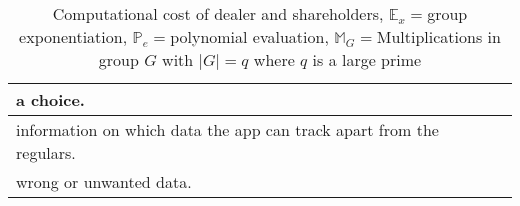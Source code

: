 \begin{table}[H]
\begin{tabular}{|p{3cm}|p{1.2cm}|p{2.5cm}|p{5.5cm}|p{2.5cm}|}
a choice.   \\ \hline
information on which data the app can track apart from the regulars. \\ 
\hline
wrong or unwanted data. \\ \hline

\end{tabular}
\caption{Computational cost of dealer and shareholders, 
$\mathbb{E}_x=$group exponentiation, $\mathbb{P}_e=$polynomial evaluation, 
$\mathbb{M}_{G}=$Multiplications in group $G$ with $|G|=q$ where $q$ is a 
large prime}
\label{tab:comp_alba_pppvss}
\end{table}

